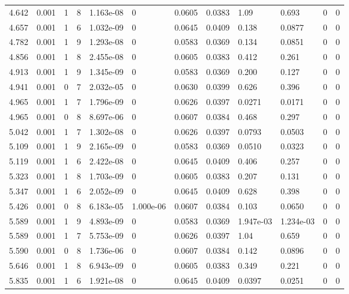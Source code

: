 \documentclass[preview]{standalone}
\begin{document}
{{{\begin{tabular}{L{1.2cm}C{1.2cm} C{0.3cm}C{0.5cm} C{1.4cm}C{1.4cm} C{1.4cm}C{1.4cm} C{1.6cm}C{1.6cm} C{1.6cm}C{1.6cm}}
  4.642  &  0.001  & 1     &  8 &  1.163e-08  & 0  &  0.0605&   0.0383& 1.09 & 0.693   &  0 & 0  \\ 
  4.657  &  0.001  & 1     &  6 &  1.032e-09  & 0  &  0.0645&   0.0409& 0.138 & 0.0877   &  0 & 0  \\ 
  4.782  &  0.001  & 1     &  9 &  1.293e-08  & 0  &  0.0583&   0.0369& 0.134 & 0.0851   &  0 & 0  \\ 
  4.856  &  0.001  & 1     &  8 &  2.455e-08  & 0  &  0.0605&   0.0383& 0.412 & 0.261   &  0 & 0  \\ 
  4.913  &  0.001  & 1     &  9 &  1.345e-09  & 0  &  0.0583&   0.0369& 0.200 & 0.127   &  0 & 0  \\ 
  4.941  &  0.001  & 0     &  7 &  2.032e-05  & 0  &  0.0630&   0.0399& 0.626 & 0.396   &  0 & 0  \\ 
  4.965  &  0.001  & 1     &  7 &  1.796e-09  & 0  &  0.0626&   0.0397& 0.0271 & 0.0171   &  0 & 0  \\ 
  4.965  &  0.001  & 0     &  8 &  8.697e-06  & 0  &  0.0607&   0.0384& 0.468 & 0.297   &  0 & 0  \\ 
  5.042  &  0.001  & 1     &  7 &  1.302e-08  & 0  &  0.0626&   0.0397& 0.0793 & 0.0503   &  0 & 0  \\ 
  5.109  &  0.001  & 1     &  9 &  2.165e-09  & 0  &  0.0583&   0.0369& 0.0510 & 0.0323   &  0 & 0  \\ 
  5.119  &  0.001  & 1     &  6 &  2.422e-08  & 0  &  0.0645&   0.0409& 0.406 & 0.257   &  0 & 0  \\ 
  5.323  &  0.001  & 1     &  8 &  1.703e-09  & 0  &  0.0605&   0.0383& 0.207 & 0.131   &  0 & 0  \\ 
  5.347  &  0.001  & 1     &  6 &  2.052e-09  & 0  &  0.0645&   0.0409& 0.628 & 0.398   &  0 & 0  \\ 
  5.426  &  0.001  & 0     &  8 &  6.183e-05  & 1.000e-06  &  0.0607&   0.0384& 0.103 & 0.0650   &  0 & 0  \\ 
  5.589  &  0.001  & 1     &  9 &  4.893e-09  & 0  &  0.0583&   0.0369& 1.947e-03 & 1.234e-03   &  0 & 0  \\ 
  5.589  &  0.001  & 1     &  7 &  5.753e-09  & 0  &  0.0626&   0.0397& 1.04 & 0.659   &  0 & 0  \\ 
  5.590  &  0.001  & 0     &  8 &  1.736e-06  & 0  &  0.0607&   0.0384& 0.142 & 0.0896   &  0 & 0  \\ 
  5.646  &  0.001  & 1     &  8 &  6.943e-09  & 0  &  0.0605&   0.0383& 0.349 & 0.221   &  0 & 0  \\ 
  5.835  &  0.001  & 1     &  6 &  1.921e-08  & 0  &  0.0645&   0.0409& 0.0397 & 0.0251   &  0 & 0  \\ 

\end{tabular}}}}
\end{document}
